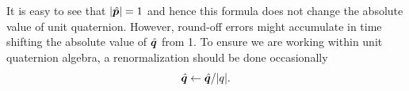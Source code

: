 It is easy to see that $|{\hat{\bm{p}}}|=1$ and hence this formula does not
change the absolute value of unit quaternion. However, round-off
errors might accumulate in time shifting the absolute value of
${\hat{\bm{q}}}$ from 1. To ensure we are working within unit quaternion
algebra, a renormalization should be done occasionally
\begin{equation}
  {\hat{\bm{q}}} \leftarrow {\hat{\bm{q}}}/|q|.
\end{equation}

